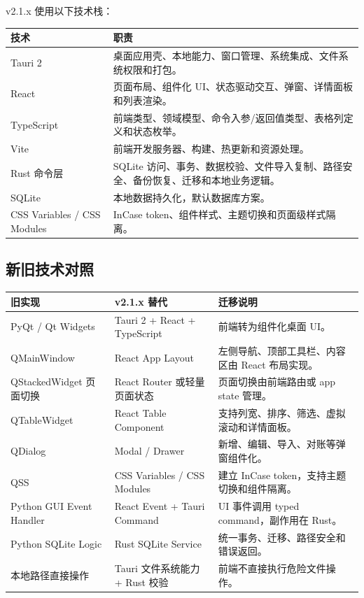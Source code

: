 \documentclass[UTF8,zihao=-4]{ctexart}
\begin{document}
v2.1.x 使用以下技术栈：

\begin{longtable}{p{4.0cm}p{10.4cm}}
\toprule
技术 & 职责 \\
\midrule
Tauri 2 & 桌面应用壳、本地能力、窗口管理、系统集成、文件系统权限和打包。 \\
React & 页面布局、组件化 UI、状态驱动交互、弹窗、详情面板和列表渲染。 \\
TypeScript & 前端类型、领域模型、命令入参/返回值类型、表格列定义和状态枚举。 \\
Vite & 前端开发服务器、构建、热更新和资源处理。 \\
Rust 命令层 & SQLite 访问、事务、数据校验、文件导入复制、路径安全、备份恢复、迁移和本地业务逻辑。 \\
SQLite & 本地数据持久化，默认数据库方案。 \\
CSS Variables / CSS Modules & InCase token、组件样式、主题切换和页面级样式隔离。 \\
\bottomrule
\end{longtable}

\subsection{新旧技术对照}

\begin{longtable}{p{5.2cm}p{5.2cm}p{4.0cm}}
\toprule
旧实现 & v2.1.x 替代 & 迁移说明 \\
\midrule
PyQt / Qt Widgets & Tauri 2 + React + TypeScript & 前端转为组件化桌面 UI。 \\
QMainWindow & React App Layout & 左侧导航、顶部工具栏、内容区由 React 布局实现。 \\
QStackedWidget 页面切换 & React Router 或轻量页面状态 & 页面切换由前端路由或 app state 管理。 \\
QTableWidget & React Table Component & 支持列宽、排序、筛选、虚拟滚动和详情面板。 \\
QDialog & Modal / Drawer & 新增、编辑、导入、对账等弹窗组件化。 \\
QSS & CSS Variables / CSS Modules & 建立 InCase token，支持主题切换和组件隔离。 \\
Python GUI Event Handler & React Event + Tauri Command & UI 事件调用 typed command，副作用在 Rust。 \\
Python SQLite Logic & Rust SQLite Service & 统一事务、迁移、路径安全和错误返回。 \\
本地路径直接操作 & Tauri 文件系统能力 + Rust 校验 & 前端不直接执行危险文件操作。 \\
\bottomrule
\end{longtable}
\end{document}
